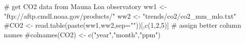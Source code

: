 \begin{Schunk}
\begin{Sinput}
 # get CO2 data from Mauna Loa observatory
 ww1 <- "ftp://aftp.cmdl.noaa.gov/products/"
 ww2 <- "trends/co2/co2_mm_mlo.txt"
 #CO2 <- read.table(paste(ww1,ww2,sep=""))[,c(1,2,5)]
 # assign better column names
 #colnames(CO2) <- c("year","month","ppm")
\end{Sinput}
\end{Schunk}
